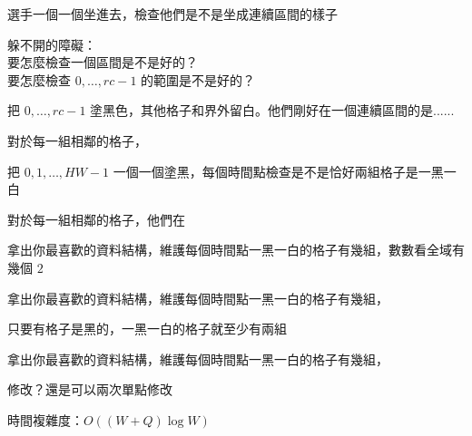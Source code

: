 \begin{frame}{}
    選手一個一個坐進去，檢查他們是不是坐成連續區間的樣子

    躲不開的障礙：\\
    要怎麼檢查一個區間是不是好的？\\
    要怎麼檢查 $0, \dots, rc - 1$ 的範圍是不是好的？
\end{frame}

\begin{frame}{}
    \todo
\end{frame}

\begin{frame}{}
    把 $0, \dots, rc - 1$ 塗黑色，其他格子和界外留白。他們剛好在一個連續區間的是......

     {
        對於每一組相鄰的格子， \\
    }
\end{frame}

\begin{frame}{}
    \todo
\end{frame}

\begin{frame}{}
    把 $0, 1, \dots, HW - 1$ 一個一個塗黑，每個時間點檢查是不是恰好兩組格子是一黑一白
\end{frame}

\begin{frame}{}
    對於每一組相鄰的格子，他們在

     {
        拿出你最喜歡的資料結構，維護每個時間點一黑一白的格子有幾組，數數看全域有幾個 $2$
    }

     {
        拿出你最喜歡的資料結構，維護每個時間點一黑一白的格子有幾組，
    }

     {
        只要有格子是黑的，一黑一白的格子就至少有兩組

        拿出你最喜歡的資料結構，維護每個時間點一黑一白的格子有幾組，
    }
\end{frame}

\begin{frame}{}
    修改？還是可以兩次單點修改

    時間複雜度：$O((W + Q) \log W)$
\end{frame}

